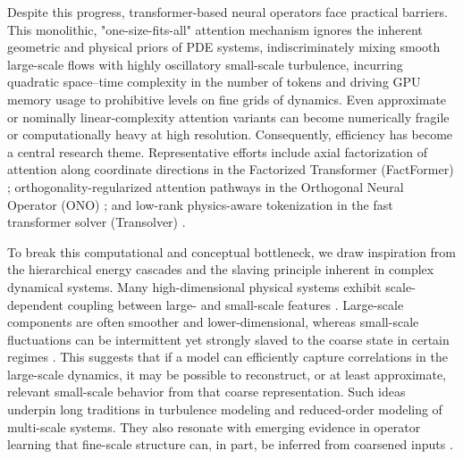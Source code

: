 \documentclass[final,3p,times]{elsarticle}
\begin{document}
Despite this progress, transformer-based neural operators face practical barriers. This monolithic, "one-size-fits-all" attention mechanism ignores the inherent geometric and physical priors of PDE systems, indiscriminately mixing smooth large-scale flows with highly oscillatory small-scale turbulence,
incurring quadratic space–time complexity in the number of tokens and driving GPU memory usage to prohibitive levels on fine grids of dynamics. Even approximate or nominally linear-complexity attention variants can become numerically fragile or computationally heavy at high resolution. Consequently, efficiency has become a central research theme. Representative efforts include axial factorization of attention along coordinate directions in the Factorized Transformer (FactFormer) \cite{li2023scalable}; orthogonality-regularized attention pathways in the Orthogonal Neural Operator (ONO) \cite{xiao2023improved}; and low-rank physics-aware tokenization in the fast transformer solver (Transolver) \cite{wu2024transolver}. 

To break this computational and conceptual bottleneck, we draw inspiration from the hierarchical energy cascades and the slaving principle inherent in complex dynamical systems. Many high-dimensional physical systems exhibit scale-dependent coupling between large- and small-scale features \cite{kraichnan1965inertial}. Large-scale components are often smoother and lower-dimensional, whereas small-scale fluctuations can be intermittent yet strongly slaved to the coarse state in certain regimes \cite{carr2012applications}. This suggests that if a model can efficiently capture correlations in the large-scale dynamics, it may be possible to reconstruct, or at least approximate, relevant small-scale behavior from that coarse representation. Such ideas underpin long traditions in turbulence modeling and reduced-order modeling of multi-scale systems. They also resonate with emerging evidence in operator learning that fine-scale structure can, in part, be inferred from coarsened inputs \cite{lai2024neural}.
\end{document}

